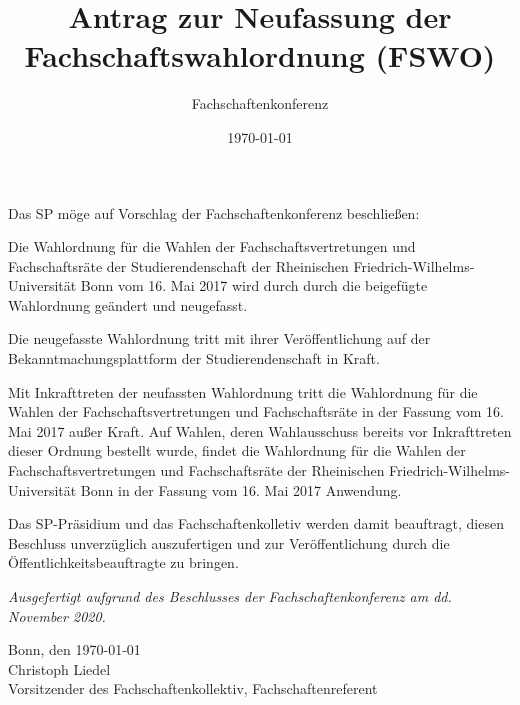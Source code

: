 \documentclass[DIV=12, parskip=half, fontsize=12pt, a4paper]{scrartcl}
\title{Antrag zur Neufassung der Fachschaftswahlordnung (FSWO)}
\author{Fachschaftenkonferenz}
\date{\today}
\begin{document}
	\maketitle
	Das SP möge auf Vorschlag der Fachschaftenkonferenz beschließen:

	\begin{linenumbers}
		Die Wahlordnung für die Wahlen der Fachschaftsvertretungen und Fachschaftsräte der Studierendenschaft der Rheinischen Friedrich-Wilhelms-Universität Bonn vom 16. Mai 2017 wird durch durch die beigefügte Wahlordnung geändert und neugefasst.

		Die neugefasste Wahlordnung tritt mit ihrer Veröffentlichung auf der Bekanntmachungsplattform der Studierendenschaft in Kraft.

		Mit Inkrafttreten der neufassten Wahlordnung tritt die Wahlordnung für die Wahlen der Fachschaftsvertretungen und Fachschaftsräte in der Fassung vom 16. Mai 2017 außer Kraft.
		Auf Wahlen, deren Wahlausschuss bereits vor Inkrafttreten dieser Ordnung bestellt wurde, findet die Wahlordnung für die Wahlen der Fachschaftsvertretungen und Fachschaftsräte der Rheinischen Friedrich-Wilhelms-Universität 	Bonn in der Fassung vom 16. Mai 2017 Anwendung.

		Das  SP-Präsidium und das Fachschaftenkolletiv  werden  damit  beauftragt,  diesen Beschluss unverzüglich auszufertigen und zur Veröffentlichung durch die Öffentlichkeitsbeauftragte zu bringen.
	\end{linenumbers}

	\vspace{1em}
	\textit{Ausgefertigt aufgrund des Beschlusses der Fachschaftenkonferenz am dd. November 2020.}

	Bonn, den \today \\
	Christoph Liedel \\
	{\scriptsize Vorsitzender des Fachschaftenkollektiv, Fachschaftenreferent}

	\clearpage
	
\end{document}

